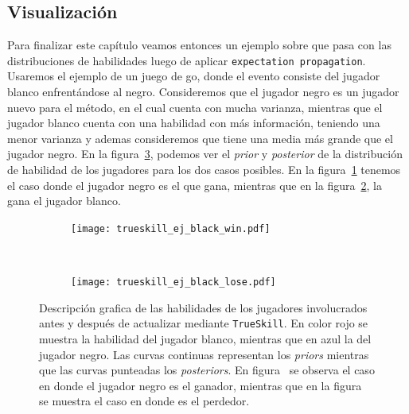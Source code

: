 \documentclass[11pt,twoside,spanish]{report} %
\begin{document}
\subsection{Visualizaci\'on}

Para finalizar este cap\'itulo veamos entonces un ejemplo sobre que pasa con las distribuciones de habilidades luego de aplicar \texttt{expectation propagation}.
Usaremos el ejemplo de un juego de go, donde el evento consiste del jugador blanco enfrent\'andose al negro.
Consideremos que el jugador negro es un jugador nuevo para el m\'etodo, en el cual cuenta con mucha varianza, mientras que el jugador blanco cuenta con una habilidad con m\'as informaci\'on, teniendo una menor varianza y ademas consideremos que tiene una media m\'as grande que el jugador negro.
En la figura~\ref{fig:ejTrue}, podemos ver el \textit{prior} y \textit{posterior} de la distribuci\'on de habilidad de los jugadores para los dos casos posibles.
En la figura~\ref{fig:ejTrueWin} tenemos el caso donde el jugador negro es el que gana, mientras que en la figura~\ref{fig:ejTrueLose}, la gana el jugador blanco.

\begin{figure}[H]
	\centering
	\begin{subfigure}[t]{.49\textwidth}
		\centering
	\texttt{[image: trueskill\_ej\_black\_win.pdf]}
	\caption{}
	\label{fig:ejTrueWin}
	\end{subfigure}
 	~
	\begin{subfigure}[t]{.49\textwidth}
		\centering
	\texttt{[image: trueskill\_ej\_black\_lose.pdf]}
	\caption{}
	\label{fig:ejTrueLose}
\end{subfigure}
	\caption{Descripci\'on grafica de las habilidades de los jugadores involucrados antes y despu\'es de actualizar mediante \texttt{TrueSkill}. En color rojo se muestra la habilidad del jugador blanco, mientras que en azul la del jugador negro. Las curvas continuas representan los \textit{priors} mientras que las curvas punteadas los \textit{posteriors}. En figura~ se observa el caso en donde el jugador negro es el ganador, mientras que en la figura~ se muestra el caso en donde es el perdedor.}
\label{fig:ejTrue}
\end{figure}
\end{document}
